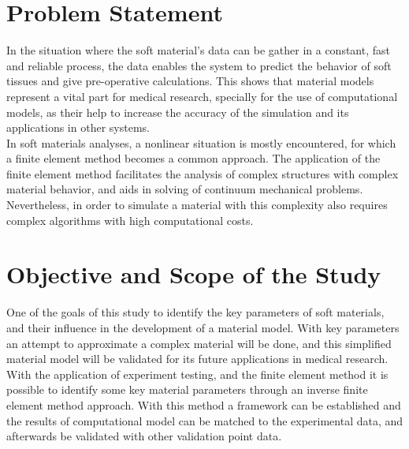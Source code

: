 \section{Problem Statement}
In the situation where the soft material's data can be gather in a constant, fast and reliable
process, the data enables the system to predict the behavior of soft tissues and give pre-operative
 calculations. This shows that material models represent a vital part for medical research, 
 specially for the use of computational models, as their help to increase the accuracy of the 
 simulation and its applications in other systems.\\

In soft materials analyses, a nonlinear situation is mostly encountered, for which a finite 
element method becomes a common approach. The application of the finite element method
 facilitates the analysis of complex structures with complex material behavior, and aids in 
 solving of continuum mechanical problems. Nevertheless, in order to simulate a material with 
 this complexity also requires complex algorithms with high computational costs. \\

 \section{Objective and Scope of the Study} 
One of the goals of this study to identify the key parameters of soft materials, and their 
influence in the development of a material model. With key parameters an attempt to 
 approximate a complex material will be done, and this simplified material model will be 
 validated for its future applications in medical research.\\
 
 With the application of experiment testing, and the finite element method it is possible 
 to identify some key material parameters through an inverse finite element method approach. With this 
 method a framework can be established and the results of computational model can be matched 
 to the experimental data, and afterwards be validated with other validation point data.

